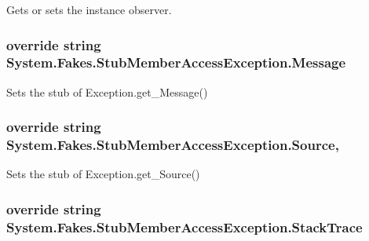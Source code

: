 Gets or sets the instance observer.

\hypertarget{class_system_1_1_fakes_1_1_stub_member_access_exception_a10a91a485391c1cc3489302256a5ee6b}{
\subsubsection[{Message}]{\setlength{\rightskip}{0pt plus 5cm}override string System.\-Fakes.\-Stub\-Member\-Access\-Exception.\-Message\hspace{0.3cm}{\ttfamily [get]}}}\label{class_system_1_1_fakes_1_1_stub_member_access_exception_a10a91a485391c1cc3489302256a5ee6b}


Sets the stub of Exception.\-get\-\_\-\-Message()

\hypertarget{class_system_1_1_fakes_1_1_stub_member_access_exception_abbeae94f648dd81825c04bc9637a68b6}{
\subsubsection[{Source}]{\setlength{\rightskip}{0pt plus 5cm}override string System.\-Fakes.\-Stub\-Member\-Access\-Exception.\-Source\hspace{0.3cm}{\ttfamily [get]}, {\ttfamily [set]}}}\label{class_system_1_1_fakes_1_1_stub_member_access_exception_abbeae94f648dd81825c04bc9637a68b6}


Sets the stub of Exception.\-get\-\_\-\-Source()

\hypertarget{class_system_1_1_fakes_1_1_stub_member_access_exception_a48817936c39f9865c084f9c037833eb8}{
\subsubsection[{Stack\-Trace}]{\setlength{\rightskip}{0pt plus 5cm}override string System.\-Fakes.\-Stub\-Member\-Access\-Exception.\-Stack\-Trace\hspace{0.3cm}{\ttfamily [get]}}}\label{class_system_1_1_fakes_1_1_stub_member_access_exception_a48817936c39f9865c084f9c037833eb8}


